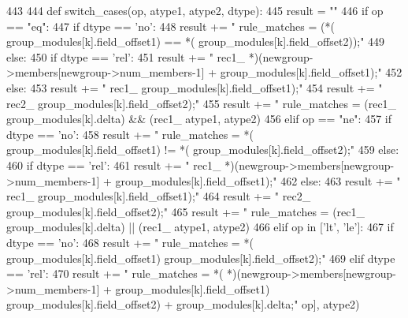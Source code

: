 \begin{DoxyCode}
443 
444 def switch_cases(op, atype1, atype2, dtype):
445     result = ""
446     if op == "eq":
447         if dtype == 'no':
448             result += "    rule_matches = (*(%
       group_modules[k].field_offset1) == *(%
       group_modules[k].field_offset2));\n"%
449         else:
450             if dtype == 'rel':
451                 result += "    rec1_%
       *)(newgroup->members[newgroup->num_members-1] + group_modules[k].field_offset1);\n"%
452             else:
453                 result += "    rec1_%
       group_modules[k].field_offset1);\n"%
454             result += "    rec2_%
       group_modules[k].field_offset2);\n"%
455             result += "    rule_matches = (rec1_%
       group_modules[k].delta) && (rec1_%
      atype1, atype2)
456     elif op == "ne":
457         if dtype == 'no':
458             result += "    rule_matches = *(%
       group_modules[k].field_offset1) != *(%
       group_modules[k].field_offset2);\n"%
459         else:
460             if dtype == 'rel':
461                 result += "    rec1_%
       *)(newgroup->members[newgroup->num_members-1] + group_modules[k].field_offset1);\n"%
462             else:
463                 result += "    rec1_%
       group_modules[k].field_offset1);\n"%
464             result += "    rec2_%
       group_modules[k].field_offset2);\n"%
465             result += "    rule_matches = (rec1_%
       group_modules[k].delta) || (rec1_%
      atype1, atype2)
466     elif op in ['lt', 'le']:
467         if dtype == 'no':
468             result += "    rule_matches = *(%
       group_modules[k].field_offset1) %
       group_modules[k].field_offset2);\n"%
469         elif dtype == 'rel':
470             result += "    rule_matches = *(%
       *)(newgroup->members[newgroup->num_members-1] + group_modules[k].field_offset1) %
       group_modules[k].field_offset2) + group_modules[k].delta;\n"%
      op], atype2)

\end{DoxyCode}

